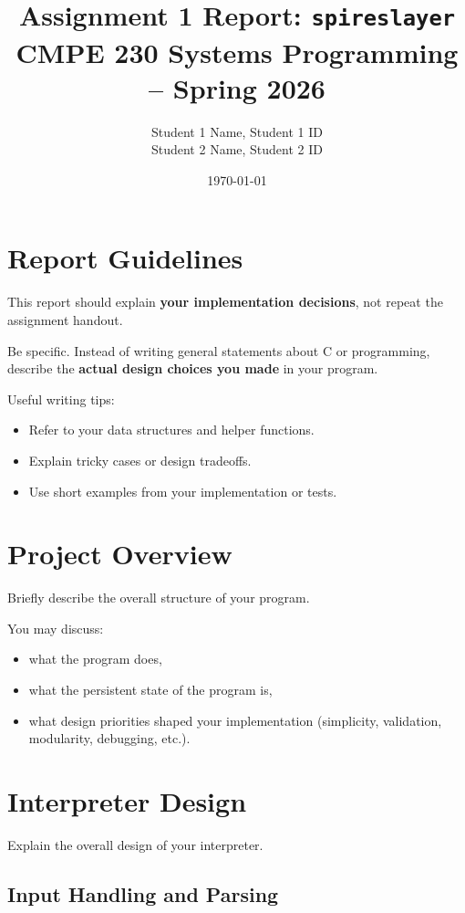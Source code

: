 \documentclass[a4paper,12pt]{article}
\title{Assignment 1 Report: \texttt{spireslayer}\\
\large CMPE 230 Systems Programming -- Spring 2026}
\author{
Student 1 Name, Student 1 ID \\
Student 2 Name, Student 2 ID
}
\date{\today}
\begin{document}
\maketitle

\section*{Report Guidelines}

This report should explain \textbf{your implementation decisions}, not repeat the assignment handout.

Be specific. Instead of writing general statements about C or programming, describe the \textbf{actual design choices you made} in your program.

Useful writing tips:
\begin{itemize}[leftmargin=1.5em]
\item Refer to your data structures and helper functions.
\item Explain tricky cases or design tradeoffs.
\item Use short examples from your implementation or tests.
\end{itemize}

\section{Project Overview}

Briefly describe the overall structure of your program.

You may discuss:
\begin{itemize}[leftmargin=1.5em]
\item what the program does,
\item what the persistent state of the program is,
\item what design priorities shaped your implementation (simplicity, validation, modularity, debugging, etc.).
\end{itemize}

\section{Interpreter Design}

Explain the overall design of your interpreter.

\subsection{Input Handling and Parsing}
\end{document}
